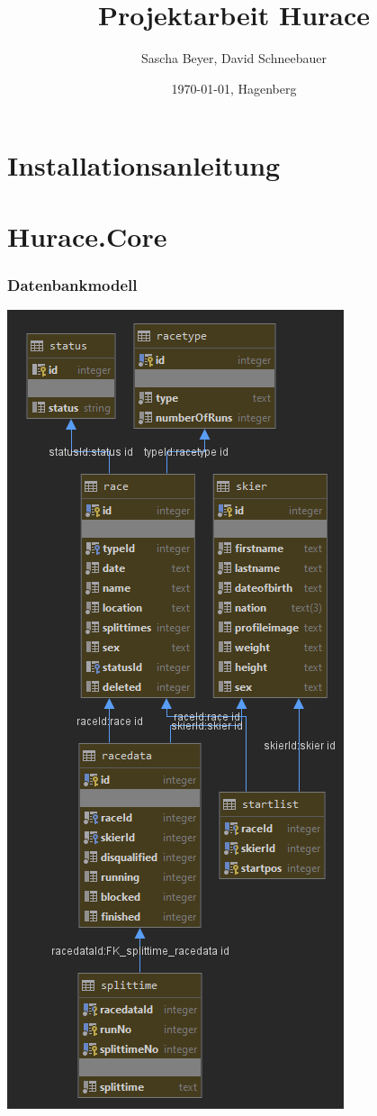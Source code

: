 \documentclass[a4paper, 12pt]{article}
\title{Projektarbeit Hurace}
\author{Sascha Beyer, David Schneebauer}
\date{\today{}, Hagenberg}
\begin{document}
	\maketitle
	\tableofcontents
	\newpage
	\section{Installationsanleitung}
	\section{Hurace.Core}
	\subsubsection{Datenbankmodell}

	\includegraphics[width=.7\textwidth]{img/huraceDB.png}
	\newpage
\end{document}
